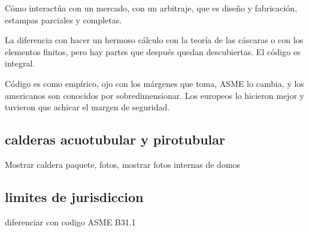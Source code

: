 Cómo interactúa con un mercado, con un arbitraje, que es diseño y fabricación, estampas parciales y completas.

La diferencia con hacer un hermoso cálculo con la teoría de las cáscaras o con los elementos finitos, pero hay partes que después quedan descubiertas. El código es integral.

Código es como empírico, ojo con los márgenes que toma, ASME lo cambia, y los americanos son conocidos por sobredimensionar. Los europeos lo hicieron mejor y tuvieron que achicar el margen de seguridad.

\subsection{calderas acuotubular y pirotubular}
Mostrar caldera paquete, fotos, mostrar fotos internas de domos

\subsection{limites de jurisdiccion}
diferenciar con codigo ASME B31.1